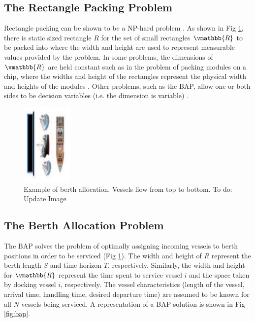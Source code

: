 \documentclass[letterpaper, 10pt, conference]{IEEEtran}
\newcommand{\TODO}[1]{{\color{green} To do: #1}} %
\begin{document}
\subsection{The Rectangle Packing Problem}
Rectangle packing can be shown to be a NP-hard problem \cite{Murata1995}. As shown in Fig \ref{fig:bapexample}, there is static sized rectangle \(R\) for the set of small rectangles \(\vmathbb{R}\) to be packed into where the width and height are used to represent measurable values provided by the problem. In some problems, the dimensions of \(\vmathbb{R}\) are held constant such as in the problem of packing modules on a chip, where the widths and height of the rectangles represent the physical width and heights of the modules \cite{Murata1995}. Other problems, such as the BAP, allow one or both sides to be decision variables (i.e. the dimension is variable) \cite{Buhrkal2010}.

\begin{figure}
	\centerline{\includegraphics[height=4cm]{bapexample.png}}
	\caption{Example of berth allocation. Vessels flow from top to bottom.\TODO{Update Image}}
	\label{fig:bapexample}
\end{figure}

\subsection{The Berth Allocation Problem}
The BAP solves the problem of optimally assigning incoming vessels to berth positions in order to be serviced (Fig \ref{fig:bapexample}). The width and height of \(R\) represent the berth length \(S\) and time horizon \(T\), respectively. Similarly, the width and height for \(\vmathbb{R}\) represent the time spent to service vessel $i$ and the space taken by docking vessel $i$, respectively. The vessel characteristics (length of the vessel, arrival time, handling time, desired departure time) are assumed to be known for all $N$ vessels being serviced. A representation of a BAP solution is shown in Fig \ref{fig:bap}.
\end{document}
